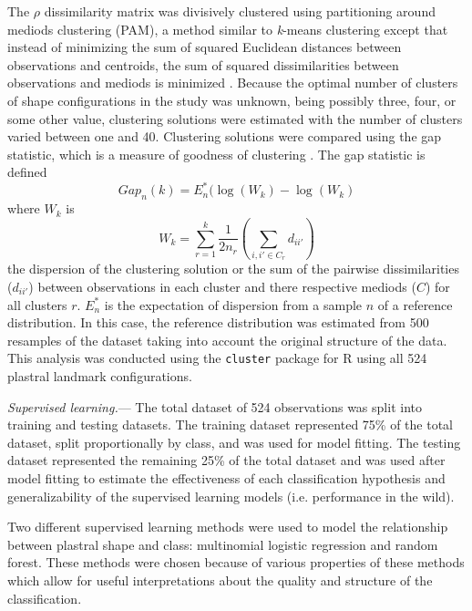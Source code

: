 \documentclass[12pt,letterpaper]{article}\usepackage{graphicx, color}
\renewcommand{\subsubsection}[1]{%
\vspace{2ex}
\noindent
\textit{#1.}---}
\begin{document}
The \(\rho\) dissimilarity matrix was divisively clustered using partitioning around mediods clustering (PAM), a method similar to \textit{k}-means clustering except that instead of minimizing the sum of squared Euclidean distances between observations and centroids, the sum of squared dissimilarities between observations and mediods is minimized \citep{Kaufman1990}.
Because the optimal number of clusters of shape configurations in the study was unknown, being possibly three, four, or some other value, clustering solutions were estimated with the number of clusters varied between one and 40. Clustering solutions were compared using the gap statistic, which is a measure of goodness of clustering \citep{Tibshirani2001a}. The gap statistic is defined
\[Gap_{n}(k) = E^{*}_{n}(\log(W_{k}) - \log(W_{k})\] 
where \(W_{k}\) is
\[W_{k} = \sum^{k}_{r = 1}{\frac{1}{2n_{r}} (\sum_{i,i' \in C_{r}} d_{ii'})}\]
the dispersion of the clustering solution or the sum of the pairwise dissimilarities (\(d_{ii'}\)) between observations in each cluster and there respective mediods (\(C\)) for all clusters \(r\). \(E^{*}_{n}\) is the expectation of dispersion from a sample \(n\) of a reference distribution. In this case, the reference distribution was estimated from 500 resamples of the dataset taking into account the original structure of the data.
This analysis was conducted using the \texttt{cluster} package for R \citep{Maechler2013} using all 524 plastral landmark configurations.

\subsubsection{Supervised learning}
The total dataset of 524 observations was split into training and testing datasets. The training dataset represented 75\% of the total dataset, split proportionally by class, and was used for model fitting. The testing dataset represented the remaining 25\% of the total dataset and  was used after model fitting to estimate the effectiveness of each classification hypothesis and generalizability of the supervised learning models (i.e. performance in the wild).

Two different supervised learning methods were used to model the relationship between plastral shape and class: multinomial logistic regression and random forest. These methods were chosen because of various properties of these methods which allow for useful interpretations about the quality and structure of the classification.
\end{document}
